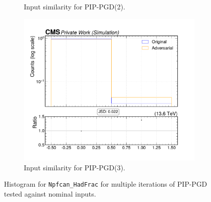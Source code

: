 \begin{figure}[htbp]
\begin{subfigure}[t]{0.32\textwidth}
    \caption*{Input similarity for PIP-PGD(2).}
  \end{subfigure}\hfill
  \begin{subfigure}[t]{0.32\textwidth}
    \includegraphics[width=\linewidth]{media/output/features/compare/combined_it_3/cmp_npf_arr_Npfcan_HadFrac.pdf}
    \caption*{Input similarity for PIP-PGD(3).}
  \end{subfigure}

  \caption*{Histogram for \texttt{Npfcan\_HadFrac} for multiple iterations of PIP-PGD tested against nominal inputs.}
  \label{fig:combined_input_Npfcan_HadFrac}
\end{figure}

